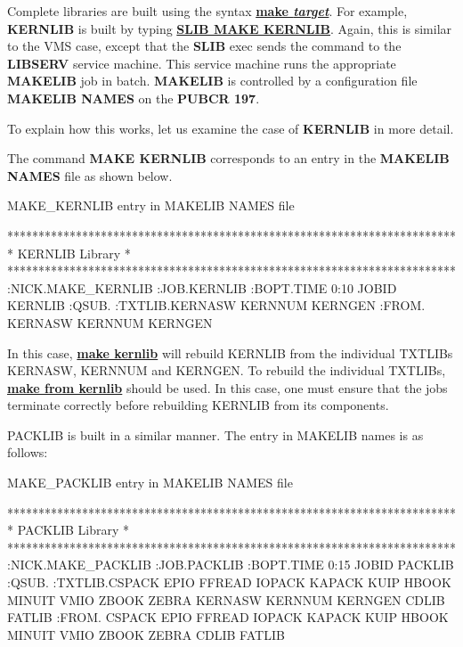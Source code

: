 Complete libraries are built using the syntax {\underline {\bf make {\it target}}}.
For example, {\bf KERNLIB} is built by typing {\underline {\bf SLIB MAKE KERNLIB}}.
Again, this is similar to the VMS case, except that the {\bf SLIB} exec sends
the command to the {\bf LIBSERV} service machine. This service machine
runs the appropriate {\bf MAKELIB} job in batch. {\bf MAKELIB} is controlled by a 
configuration file {\bf MAKELIB NAMES} on the {\bf PUBCR 197}.

To explain how this works, let us examine the case of {\bf KERNLIB} in more detail.

The command {\bf MAKE KERNLIB} corresponds to an entry in the {\bf MAKELIB NAMES}
file as shown below.

\begin{XMPt}{MAKE\_KERNLIB entry in MAKELIB NAMES file}

************************************************************************
* KERNLIB Library                                                      *
************************************************************************
:NICK.MAKE_KERNLIB
:JOB.KERNLIB   :BOPT.TIME  0:10 JOBID KERNLIB
               :QSUB.
:TXTLIB.KERNASW KERNNUM KERNGEN
:FROM.  KERNASW KERNNUM KERNGEN

\end{XMPt}

In this case, {\underline {\bf make kernlib}} will rebuild KERNLIB from the
individual TXTLIBs KERNASW, KERNNUM and KERNGEN. To rebuild
the individual TXTLIBs, {\underline {\bf make from kernlib}} should be used.
In this case, one must ensure that the jobs terminate correctly before
rebuilding KERNLIB from its components.

PACKLIB is built in a similar manner. The entry in MAKELIB names is as follows:

\begin{XMPt}{MAKE\_PACKLIB entry in MAKELIB NAMES file}

************************************************************************
* PACKLIB Library                                                      *
************************************************************************
:NICK.MAKE_PACKLIB
:JOB.PACKLIB   :BOPT.TIME  0:15 JOBID PACKLIB
               :QSUB.
:TXTLIB.CSPACK EPIO FFREAD IOPACK KAPACK KUIP HBOOK MINUIT VMIO
        ZBOOK ZEBRA KERNASW KERNNUM KERNGEN CDLIB FATLIB
:FROM.  CSPACK EPIO FFREAD IOPACK KAPACK KUIP HBOOK MINUIT VMIO
        ZBOOK ZEBRA CDLIB FATLIB

\end{XMPt}


